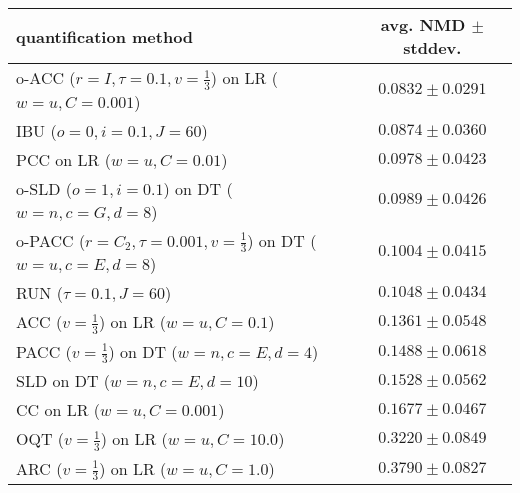 \begin{tabular}{lc}
  \toprule
  quantification method & avg. NMD $\pm$ stddev. \\
  \midrule
  o-ACC ($r=I, \tau=0.1, v=\frac{1}{3}$) on LR ($w=u, C=0.001$) & $\mathbf{0.0832 \pm 0.0291}$ \\
  IBU ($o=0, i=0.1, J=60$) & $\mathbf{0.0874 \pm 0.0360}$ \\
  PCC on LR ($w=u, C=0.01$) & $0.0978 \pm 0.0423$ \\
  o-SLD ($o=1, i=0.1$) on DT ($w=n, c=G, d=8$) & $0.0989 \pm 0.0426$ \\
  o-PACC ($r=C_2, \tau=0.001, v=\frac{1}{3}$) on DT ($w=u, c=E, d=8$) & $0.1004 \pm 0.0415$ \\
  RUN ($\tau=0.1, J=60$) & $0.1048 \pm 0.0434$ \\
  ACC ($v=\frac{1}{3}$) on LR ($w=u, C=0.1$) & $0.1361 \pm 0.0548$ \\
  PACC ($v=\frac{1}{3}$) on DT ($w=n, c=E, d=4$) & $0.1488 \pm 0.0618$ \\
  SLD on DT ($w=n, c=E, d=10$) & $0.1528 \pm 0.0562$ \\
  CC on LR ($w=u, C=0.001$) & $0.1677 \pm 0.0467$ \\
  OQT ($v=\frac{1}{3}$) on LR ($w=u, C=10.0$) & $0.3220 \pm 0.0849$ \\
  ARC ($v=\frac{1}{3}$) on LR ($w=u, C=1.0$) & $0.3790 \pm 0.0827$ \\
  \bottomrule
\end{tabular}
